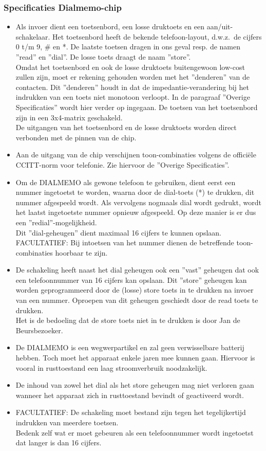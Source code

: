 \subsubsection{Specificaties Dialmemo-chip}


\begin{itemize}
\item
Als invoer dient een toetsenbord, een losse druktoets en een
aan/uit-schakelaar. Het toetsenbord heeft de bekende telefoon-layout,
d.w.z.\ de cijfers 0 t/m 9, \# en *. De laatste toetsen dragen in ons
geval resp. de namen ''read'' en ''dial''.
De losse toets draagt de naam ''store''.\\
Omdat het toetsenbord en ook de losse druktoets buitengewoon low-cost
zullen zijn, moet er rekening gehouden worden met het ''denderen'' van
de contacten. Dit ''denderen'' houdt in dat de impedantie-verandering
bij het indrukken van een toets niet monotoon verloopt. In de
paragraaf ''Overige Specificaties'' wordt hier verder op ingegaan. De
toetsen van het toetsenbord zijn in een 3x4-matrix geschakeld.\\
De uitgangen van het toetsenbord en de losse druktoets worden direct
verbonden met de pinnen van de chip.
\item
Aan de uitgang van de chip verschijnen toon-combinaties volgens de
offici\"ele CCITT-norm voor telefonie. Zie hiervoor de ''Overige
Specificaties''.
\item
Om de DIALMEMO als gewone telefoon te gebruiken, dient eerst een
nummer ingetoetst te worden, waarna door de dial-toets (*) te
drukken, dit nummer afgespeeld wordt. Als vervolgens nogmaals dial
wordt gedrukt, wordt het laatst ingetoetste nummer opnieuw afgespeeld.
Op deze manier is er dus een ''redial''-mogelijkheid.\\
Dit ''dial-geheugen'' dient maximaal 16 cijfers te kunnen opslaan.\\
FACULTATIEF: Bij intoetsen van het nummer dienen de betreffende
toon-combinaties hoorbaar te zijn.
\item
De schakeling heeft naast het dial geheugen ook een ''vast'' geheugen
dat ook een telefoonnummer van 16 cijfers kan opslaan. Dit ''store''
geheugen kan worden geprogrammeerd door de (losse) store toets in te
drukken na invoer van een nummer. Oproepen van dit geheugen geschiedt
door de read toets te drukken.\\
Het is de bedoeling dat de store toets niet in te drukken is door Jan
de Beursbezoeker.
\item
De DIALMEMO is een wegwerpartikel en zal geen verwisselbare batterij
hebben. Toch moet het apparaat enkele jaren mee kunnen gaan. Hiervoor
is vooral in rusttoestand een laag stroomverbruik noodzakelijk.
\item
De inhoud van zowel het dial als het store geheugen mag niet verloren
gaan wanneer het apparaat zich in rusttoestand bevindt of geactiveerd
wordt.
\item
FACULTATIEF: De schakeling moet bestand zijn tegen het tegelijkertijd
indrukken van meerdere toetsen.\\
Bedenk zelf wat er moet gebeuren als een telefoonnummer wordt ingetoetst
dat langer is dan 16 cijfers.
\end{itemize}




